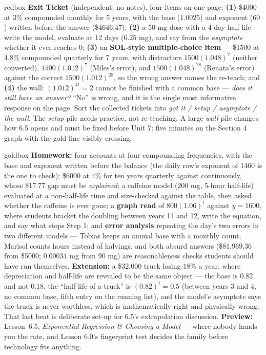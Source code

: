 \documentclass[10pt]{article}
\begin{document}
\begin{skillbox}{redbox}
\textbf{Exit Ticket} (independent, no notes), four items on one page: \textbf{(1)} \$4000 at $3\%$
compounded monthly for 5 years, with the base ($1.0025$) and exponent ($60$) written before the answer
(\$4646.47); \textbf{(2)} a 50 mg dose with a 4-day half-life --- write the model, evaluate at 12 days
($6.25$ mg), and say from the \emph{asymptote} whether it ever reaches $0$; \textbf{(3)} an
\textbf{SOL-style multiple-choice item} --- \$1500 at $4.8\%$ compounded quarterly for 7 years, with
distractors $1500(1.048)^{7}$ (neither converted), $1500(1.012)^{7}$ (Miles's error), and
$1500(1.048)^{28}$ (Renata's error) against the correct $1500(1.012)^{28}$, so the wrong answer names
the re-teach; and \textbf{(4)} the wall: $(1.012)^{4t}=2$ cannot be finished with a common base ---
\emph{does it still have an answer?} ``No'' is wrong, and it is the single most informative response on
the page. Sort the collected tickets into \emph{got it / setup / asymptote / the wall}. The
\emph{setup} pile needs practice, not re-teaching. A large \emph{wall} pile changes how 6.5 opens and
must be fixed before Unit 7: five minutes on the Section 4 graph with the gold line visibly crossing.
\end{skillbox}

\begin{skillbox}{goldbox}
\textbf{Homework:} four accounts at four compounding frequencies, with the base and exponent written
before the balance (the daily row's exponent of $1460$ is the one to check); \$6000 at $4\%$ for ten
years quarterly against continuously, whose \$17.77 gap must be \emph{explained}; a caffeine model
(200 mg, 5-hour half-life) evaluated at a non-half-life time and size-checked against the table, then
asked whether the caffeine is ever gone; a \textbf{graph read} of $800(1.06)^{t}$ against $y=1600$,
where students bracket the doubling between years 11 and 12, write the equation, and say what stops
Step 1; and \textbf{error analysis} repeating the day's two errors in two different models --- Tobias
keeps an annual base with a monthly count, Marisol counts hours instead of halvings, and both absurd
answers (\$81{,}969.36 from \$5000; $0.00034$ mg from 90 mg) are reasonableness checks students should
have run themselves. \textbf{Extension:} a \$32{,}000 truck losing $18\%$ a year, where depreciation and
half-life are revealed to be the same object --- the base is $0.82$ and not $0.18$, the ``half-life of a
truck'' is $(0.82)^{t}=0.5$ (between years 3 and 4, no common base, fifth entry on the running list),
and the model's asymptote says the truck is never worthless, which is mathematically right and
physically wrong. That last beat is deliberate set-up for 6.5's extrapolation discussion.
\textbf{Preview:} Lesson~6.5, \emph{Exponential Regression \& Choosing a Model} --- where nobody hands
you the rate, and Lesson 6.0's fingerprint test decides the family before technology fits anything.
\end{skillbox}
\end{document}
